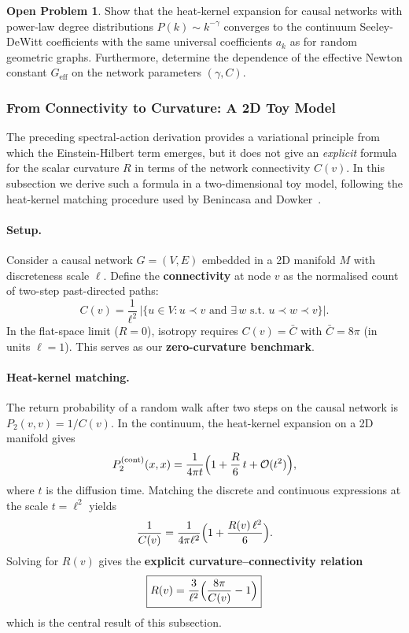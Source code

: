 \documentclass[11pt,a4paper]{article}
\theoremstyle{definition}
\newtheorem{openproblem}{Open Problem}[section]
\theoremstyle{remark}
\newcommand{\Geff}{G_{\text{eff}}}
\begin{document}
\begin{openproblem}\label{op:heat-kernel}
Show that the heat-kernel expansion for causal networks with power-law degree
distributions $P(k) \sim k^{-\gamma}$ converges to the continuum
Seeley-DeWitt coefficients with the same universal coefficients $a_{k}$ as for
random geometric graphs. Furthermore, determine the dependence of the effective
Newton constant $\Geff$ on the network parameters $(\gamma, C)$.
\end{openproblem}

\subsubsection{From Connectivity to Curvature: A 2D Toy Model}\label{subsubsec:c-to-curvature}

The preceding spectral-action derivation provides a variational principle from
which the Einstein-Hilbert term emerges, but it does not give an \emph{explicit}
formula for the scalar curvature $R$ in terms of the network connectivity
$C(v)$.  In this subsection we derive such a formula in a two-dimensional toy
model, following the heat-kernel matching procedure used by Benincasa and
Dowker~\cite{Benincasa2010}.

\paragraph{Setup.}  Consider a causal network $G=(V,E)$ embedded in a
2D manifold $M$ with discreteness scale $\ell$.  Define the \textbf{connectivity}
at node $v$ as the normalised count of two-step past-directed paths:
\begin{equation}\label{eq:Cv-def}
C(v) = \frac{1}{\ell^{2}}\,\bigl|\{u\in V : u\prec v\text{ and }\exists\,w\text{ s.t. }u\prec w\prec v\}\bigr|.
\end{equation}
In the flat-space limit ($R=0$), isotropy requires $C(v)=\bar C$ with
$\bar C = 8\pi$ (in units $\ell=1$).  This serves as our \textbf{zero-curvature
benchmark}.

\paragraph{Heat-kernel matching.}  The return probability of a random walk
after two steps on the causal network is $P_{2}(v,v)=1/C(v)$.  In the
continuum, the heat-kernel expansion on a 2D manifold gives
\begin{equation}
P_{2}^{(\text{cont})}(x,x) = \frac{1}{4\pi t}
\Bigl(1 + \frac{R}{6}\,t + \mathcal{O}(t^{2})\Bigr),
\end{equation}
where $t$ is the diffusion time.  Matching the discrete and continuous
expressions at the scale $t=\ell^{2}$ yields
\begin{equation}
\frac{1}{C(v)} = \frac{1}{4\pi\ell^{2}}
\Bigl(1 + \frac{R(v)\,\ell^{2}}{6}\Bigr).
\end{equation}
Solving for $R(v)$ gives the \textbf{explicit curvature--connectivity relation}
\begin{equation}\label{eq:R-from-C}
\boxed{
R(v) = \frac{3}{\ell^{2}}\Bigl(\frac{8\pi}{C(v)} - 1\Bigr)
}
\end{equation}
which is the central result of this subsection.
\end{document}
